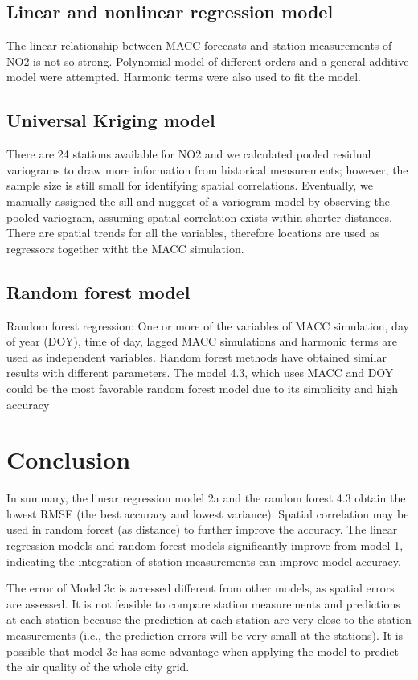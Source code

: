 \documentclass{article}
\begin{document}
\subsection{Linear and nonlinear regression model}  
The linear relationship between MACC forecasts and station
measurements of NO2 is not so strong. Polynomial model of different
orders and a general additive model were attempted. Harmonic terms
were also used to fit the model.

\subsection{Universal Kriging model}  
There are 24 stations available for NO2 and we calculated pooled
residual variograms to draw more information from historical
measurements; however, the sample size is still small for identifying
spatial correlations. Eventually, we manually assigned the sill and
nuggest of a variogram model by observing the pooled variogram,
assuming spatial correlation exists within shorter distances. There
are spatial trends for all the variables, therefore locations are used
as regressors together witht the MACC simulation.

\subsection{Random forest model}  
Random forest regression: One or more of the variables of MACC
simulation, day of year (DOY), time of day, lagged MACC simulations
and harmonic terms are used as independent variables. Random forest
methods have obtained similar results with different parameters. The
model 4.3, which uses MACC and DOY could be the most favorable random
forest model due to its simplicity and high accuracy


\section{Conclusion}

In summary, the linear regression model 2a and the random forest 4.3
obtain the lowest RMSE (the best accuracy and lowest
variance). Spatial correlation may be used in random forest (as
distance) to further improve the accuracy. The linear regression
models and random forest models significantly improve from model 1,
indicating the integration of station measurements can improve model
accuracy.

The error of Model 3c is accessed different from other models, as
spatial errors are assessed. It is not feasible to compare station
measurements and predictions at each station because the prediction at
each station are very close to the station measurements (i.e., the
prediction errors will be very small at the stations). It is possible
that model 3c has some advantage when applying the model to predict
the air quality of the whole city grid.



\end{document}
